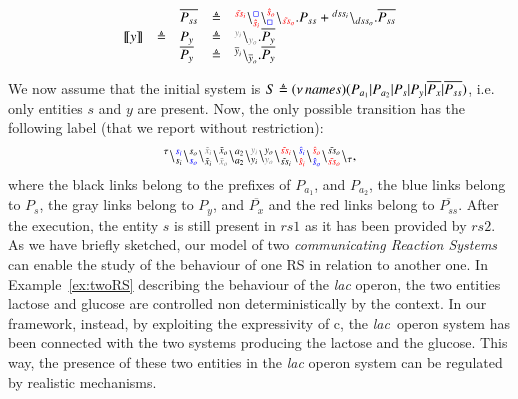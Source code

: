 \begin{example}
\[\begin{array}{lclcl}
&&\overline{P_{ss}}&\defeq &\startchain{{\color{red}\tilde{ss}_i}}\chainedlink{{\color{red}\hat{s}_i}}{{\color{blue}\noact}}\chainedlink{{\color{blue}\noact}}{{\color{red}\hat{s}_o}}\chainend{{\color{red}\tilde{ss}_o}}.P_{ss}
+
\startchain{dss_i}\chainend{dss_o}.\overline{P_{ss}}\\
\llbracket y\rrbracket&\defeq & P_{y}&\defeq &\startchain{{\color{gray}y_i}}\chainend{{\color{gray}y_o}}.\overline{P_{y}} \\
&&\overline{P_{y}}&\defeq &
\startchain{\overline{y}_i}\chainend{\overline{y}_o}.\overline{P_{y}}
\end{array}
\]

\end{example}

\noindent
We now assume that the initial system is $S \triangleq (\nu\, names)(P_{a_1}|P_{a_2}|P_s|P_y|\overline{P_x}|\overline{P_{ss}})$, i.e.
only entities $s$ and $y$ are present. Now, the only possible transition has  the following label (that we report without restriction):
\[
\startchain{\silent}\chainedlink{s_i}{{\color{blue}s_i}}\chainedlink{{\color{blue}s_o}}{s_o}\chainedlink{\tilde{x}_i}{{\color{gray}\tilde{x}_i}}\chainedlink{{\color{gray}\tilde{x}_o}}{\tilde{x}_o} \chainedlink{a_2}{a_2}\chainedlink{y_i}{ {\color{gray}y_i}}\chainedlink{{\color{gray}y_o}}{y_o}\chainedlink{\tilde{ss}_i}{{\color{red}\tilde{ss}_i}}
\chainedlink{{\color{red}\hat{s}_i}}{{\color{blue}\hat{s}_i}}
\chainedlink{{\color{blue}\hat{s}_o}}{{\color{red}\hat{s}_o}}
\chainedlink{{\color{red}\tilde{ss}_o}}{\tilde{ss}_o}\chainend{\silent},
\]
where the black links belong to the prefixes of $P_{a_1}$, and $P_{a_2}$, the blue links belong to $P_s$, the gray links belong to $P_y$, and $\overline{P_x}$ and the red links belong to $\overline{P_{ss}}$.
After the execution, the entity $s$ is still present in $rs1$ as it has been provided by $rs2$.\\

As we have briefly sketched, our model of two \emph{communicating Reaction Systems} 
can enable the study of the behaviour of one RS
in relation to another one.
In Example~\ref{ex:twoRS} describing  the behaviour of the \emph{lac} operon,
the two entities lactose and glucose are controlled 
non deterministically by the context.
In our framework,
instead, by exploiting the expressivity of c\CNA, 
the \emph{lac} operon system has been connected with the two systems 
producing the lactose and the glucose.
This way, the presence of these two entities in the \emph{lac} operon system 
can be regulated by realistic mechanisms.



